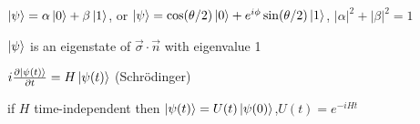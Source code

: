 
\begin{squishlist}
    \item $\ket{\psi} = \alpha \ket{0} + \beta \ket{1}$, or $\ket{\psi} = \cos(\theta/2)\ket{0} + e^{i\phi} \sin(\theta/2)\ket{1}$, $|\alpha|^2 + |\beta|^2 = 1$
    \item $\ket{\psi}$ is an eigenstate of $\vec{\sigma}\cdot \vec{n}$ with eigenvalue 1
\end{squishlist}

\begin{squishlist}
    \item $i \D{t}{\ket{\psi(t)}} = H \ket{\psi(t)}$ (Schrödinger)
    \item if $H$ time-independent then $\ket{\psi(t)} = U(t) \ket{\psi(0)}$,\quad $U(t) = e^{-iHt}$
\end{squishlist}

